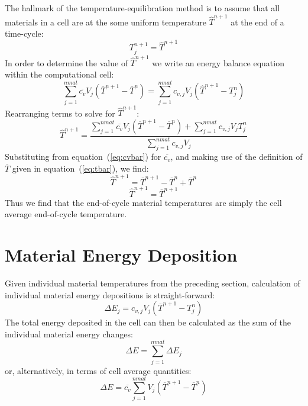 \documentclass[12pt]{article}
\begin{document}
The hallmark of the temperature-equilibration method is to assume
that all materials in a cell are at the some uniform temperature 
$\widehat{T}^{n+1}$
at the end of a time-cycle:
\begin{equation}
T_{j}^{n+1} = \widehat{T}^{n+1}
\end{equation}
In order to determine the value of $\widehat{T}^{n+1}$ 
we write an energy balance equation within the computational cell:
\begin{equation}
 \sum_{j=1}^{nmat} \overline{c_{v}} V_{j} 
(\overline{T}^{n+1}-\overline{T}^{n}) = 
\sum_{j=1}^{nmat} c_{v,j} V_{j} (\widehat{T}^{n+1} - T_{j}^{n})
\end{equation}
Rearranging terms to solve for $\widehat{T}^{n+1}$:
\begin{equation}
\widehat{T}^{n+1} = \frac{ \sum_{j=1}^{nmat} \overline{c_{v}} V_{j}    
(\overline{T}^{n+1}-\overline{T}^{n}) +
\sum_{j=1}^{nmat} c_{v,j} V_{j} T_{j}^{n} }
{\sum_{j=1}^{nmat} c_{v,j}V_{j}}
\end{equation}
Substituting from equation~(\ref{eq:cvbar}) for $\overline{c_{v}}$, and
making use of the definition of $\overline{T}$ given in 
equation~(\ref{eq:tbar}), we find:
\begin{equation}
\widehat{T}^{n+1} = \overline{T}^{n+1} - \overline{T}^{n} + \overline{T}^{n}
\end{equation}
\begin{equation}
\widehat{T}^{n+1} = \overline{T}^{n+1}
\end{equation}
Thus we find that the end-of-cycle material temperatures are simply the cell
average end-of-cycle temperature.

\section{Material Energy Deposition}
Given individual material temperatures from the preceding section,
calculation of individual material energy depositions is straight-forward:
\begin{equation}
\Delta E_{j} = c_{v,j} V_{j} (\overline{T}^{n+1}-T_{j}^{n})
\end{equation}
The total energy deposited in the cell can then be calculated as
the sum of the individual material energy changes:
\begin{equation}
\Delta E = \sum_{j=1}^{nmat} \Delta E_{j}
\end{equation}
or, alternatively, in terms of cell average quantities:
\begin{equation}
\Delta E = \overline{c_v}\sum_{j=1}^{nmat} V_{j}
(\overline{T}^{n+1} - \overline{T}^{n})
\end{equation}
\end{document}
